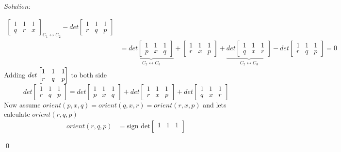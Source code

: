 \documentclass[a4paper, 8pt, oneside]{article}
\newenvironment{sol}
    {\emph{Solution:}
    }
    {
    \qed
    }
\begin{document}
\begin{enumerate}
\begin{enumerate}
\begin{sol}
\begin{align*}
{\begin{bmatrix}
    1 & 1 & 1\\
    q & r & x
\end{bmatrix}}_{C_1 \leftrightarrow C_2} -
det
\begin{bmatrix}
    1 & 1 & 1\\
    r & q & p
\end{bmatrix}  \\&=
\underbrace{det\begin{bmatrix}
    1 & 1 & 1\\
    p& x & q
\end{bmatrix}}_{C_2 \leftrightarrow C_3}
+
\begin{bmatrix}
    1 & 1 & 1\\
    r & x& p
\end{bmatrix}
+ \underbrace{det
\begin{bmatrix}
    1 & 1 & 1\\
    q & x & r
\end{bmatrix}}_{C_2 \leftrightarrow C_3} -
det
\begin{bmatrix}
    1 & 1 & 1\\
    r & q & p
\end{bmatrix} = 0
\end{align*}
Adding $\small det
\begin{bmatrix}
    1 & 1 & 1\\
    r & q & p
\end{bmatrix}$ to  both side
\begin{equation}\label{interiority}
det
\begin{bmatrix}
    1 & 1 & 1\\
    r & q & p
\end{bmatrix} =
det
\begin{bmatrix}
    1 & 1 & 1\\
    p& x & q
\end{bmatrix} +
det
\begin{bmatrix}
    1 & 1 & 1\\
    r & x& p
\end{bmatrix} +
det
\begin{bmatrix}
    1 & 1 & 1\\
    q & x & r
\end{bmatrix} 
\end{equation}
Now assume $orient(p,x,q) =orient(q,x,r) = orient(r,x,p)$ and lets calculate $orient(r,q,p)$
\begin{align*}
orient(r,q,p) &= \text{sign det}
\begin{bmatrix}
    1 & 1 & 1\\

\end{bmatrix}
\end{align*}
\end{sol}
\end{enumerate}
\end{enumerate}
\end{document}
